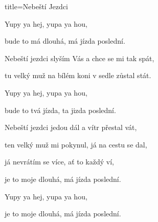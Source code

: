\begin{song}{title=\centering Nebeští Jezdci \\\normalsize \vspace*{-0.3cm}}
{\begin{minipage}[t]{0.57\textwidth}
	Yupy ya hej, yupa ya hou,
	
	bude to má dlouhá, má jízda poslední.
		

\end{minipage}\begin{minipage}[t]{0.55\textwidth}\setlength{\parindent}{0.45cm}\vspace*{0.55cm}  %

\sloka
	Nebeští jezdci slyším Vás a chce se mi tak spát,
	
	tu velký muž na bílém koni v sedle zůstal stát.
	
	
	Yupy ya hej, yupa ya hou,
	
	bude to tvá jízda, ta jizda poslední.
	
\sloka
	Nebeští jezdci jedou dál a vítr přestal vát,
	
	ten velký muž mi pokynul, já na cestu se dal,
	
	já nevrátím se více, ať to každý ví,
	
	je to moje dlouhá, má jízda poslední.
	
	Yupy ya hej, yupa ya hou,
	
	je to moje dlouhá, má jízda poslední.


\end{minipage}
}
\setcounter{Slokočet}{0}
\end{song}

